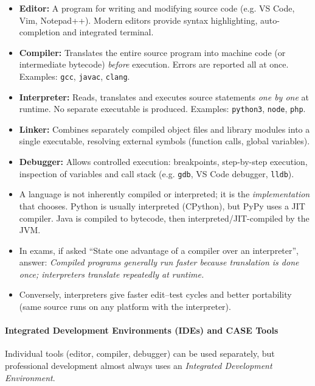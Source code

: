 \documentclass[11pt]{article}
\begin{document}
\begin{definition}
\begin{itemize}
\item \textbf{Editor:} A program for writing and modifying source code (e.g. VS Code, Vim, Notepad++). Modern editors provide syntax highlighting, auto-completion and integrated terminal.
\item \textbf{Compiler:} Translates the entire source program into machine code (or intermediate bytecode) \emph{before} execution. Errors are reported all at once. Examples: \texttt{gcc}, \texttt{javac}, \texttt{clang}.
\item \textbf{Interpreter:} Reads, translates and executes source statements \emph{one by one} at runtime. No separate executable is produced. Examples: \texttt{python3}, \texttt{node}, \texttt{php}.
\item \textbf{Linker:} Combines separately compiled object files and library modules into a single executable, resolving external symbols (function calls, global variables).
\item \textbf{Debugger:} Allows controlled execution: breakpoints, step-by-step execution, inspection of variables and call stack (e.g. \texttt{gdb}, VS Code debugger, \texttt{lldb}).
\end{itemize}
\end{definition}

\begin{attention}
\begin{itemize}
\item A language is not inherently compiled or interpreted; it is the \emph{implementation} that chooses. Python is usually interpreted (CPython), but PyPy uses a JIT compiler. Java is compiled to bytecode, then interpreted/JIT-compiled by the JVM.
\item In exams, if asked ``State one advantage of a compiler over an interpreter'', answer: \emph{Compiled programs generally run faster because translation is done once; interpreters translate repeatedly at runtime.}
\item Conversely, interpreters give faster edit–test cycles and better portability (same source runs on any platform with the interpreter).
\end{itemize}
\end{attention}

\paragraph{Integrated Development Environments (IDEs) and CASE Tools}
Individual tools (editor, compiler, debugger) can be used separately, but professional development almost always uses an \emph{Integrated Development Environment}.
\end{document}

